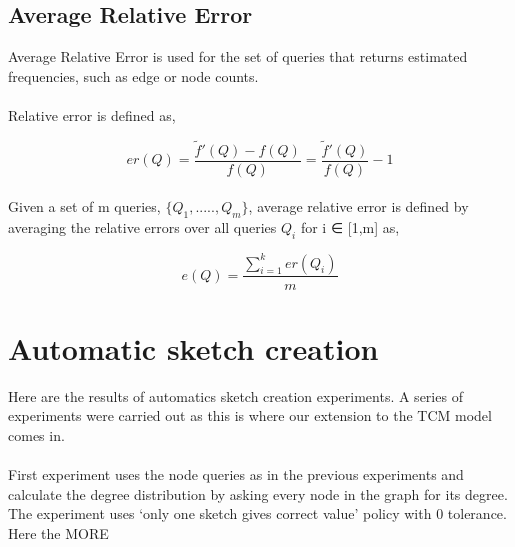 \documentclass[12pt]{report}
\numberwithin{figure}{section}
\numberwithin{table}{section}
\begin{document}
\subsection{Average Relative Error}
Average Relative Error is used for the set of queries that returns estimated frequencies, such as edge or node counts.

\paragraph{}

Relative error is defined as, 

\begin{equation}
er(Q) =  \frac{\tilde{f}'(Q) - f(Q)}{f(Q)} = \frac{\tilde{f}'(Q)}{f(Q)} -1 
\end{equation}

\paragraph{}

Given a set of m queries, $\{ Q_1 , ....., Q_m \}$, average relative error is defined by averaging the relative errors over all queries $Q_i$ for i ∈ [1,m] as,

\begin{equation}
e(Q) =  \frac{\sum_{i=1}^{k} er(Q_i)}{m}
\end{equation}

\section{Automatic sketch creation}
Here are the results of automatics sketch creation experiments. A series of experiments were carried out as this is where our extension to the TCM model comes in. 

\paragraph{}

First experiment uses the node queries as in the previous experiments and calculate the degree distribution by asking every node in the graph for its degree. The experiment uses ‘only one sketch gives correct value’ policy with 0 tolerance. Here the MORE
\end{document}

